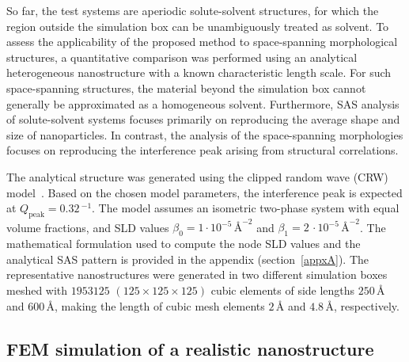 \documentclass[preprint, 5p, times, twocolumn]{elsarticle}
\begin{document}
So far, the test systems are aperiodic solute-solvent structures, for which the region outside the simulation box can be unambiguously treated as solvent. To assess the applicability of the proposed method to space-spanning morphological structures, a quantitative comparison was performed using an analytical heterogeneous nanostructure with a known characteristic length scale. For such space-spanning structures, the material beyond the simulation box cannot generally be approximated as a homogeneous solvent. Furthermore, SAS analysis of solute-solvent systems focuses primarily on reproducing the average shape and size of nanoparticles. In contrast, the analysis of the space-spanning morphologies focuses on reproducing the interference peak arising from structural correlations. 

The analytical structure was generated using the clipped random wave (CRW) model~\cite{berk1991scattering, chen1997measurement, choy2000clipped, hedstrom2004pore}. Based on the chosen model parameters, the interference peak is expected at $Q_{\text{peak}}=0.32$\,\text{\AA}$^{-1}$. The model assumes an isometric two-phase system with equal volume fractions, and SLD values $\beta_0=1\cdot 10^{-5}\,\text{\AA}^{-2}$ and $\beta_1=2\,\cdot 10^{-5}\,\text{\AA}^{-2}$. The mathematical formulation used to compute the node SLD values and the analytical SAS pattern is provided in the appendix (section~\ref{appxA}). The representative nanostructures were generated in two different simulation boxes meshed with $1953125$ $(125 \times 125 \times 125)$ cubic elements of side lengths $250$\,\AA{} and $600$\,\AA{}, making the length of cubic mesh elements $2$\,\AA{} and $4.8$\,\AA{}, respectively.

    \subsection{FEM simulation of a realistic nanostructure}
\label{subsec:mat_method_fem}
\end{document}
